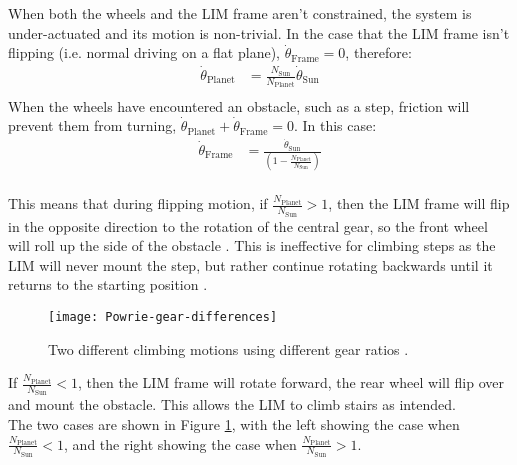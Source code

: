 When both the wheels and the LIM frame aren't constrained, the system is under-actuated and its motion is non-trivial. In the case that the LIM frame isn't flipping (i.e. normal driving on a flat plane), $\dot{\theta}_{\mathrm{Frame}} = 0$, therefore:\\
 \begin{align*}
 	\dot{\theta}_{\mathrm{Planet}} &= \frac{N_\mathrm{Sun}}{N_\mathrm{Planet}}\dot{\theta}_{\mathrm{Sun}} \tag{2}\\
 \end{align*}
When the wheels have encountered an obstacle, such as a step, friction will prevent them from turning, $\dot{\theta}_{\mathrm{Planet}} + \dot{\theta}_{\mathrm{Frame}} = 0$. In this case:
\begin{align*}
	\dot{\theta}_{\mathrm{Frame}} &= \frac{\dot{\theta}_{\mathrm{Sun}}}{(1-\frac{N_\mathrm{Planet}}{N_\mathrm{Sun}})} \tag{3}\\
\end{align*}

This means that during flipping motion, if $\frac{N_\mathrm{Planet}}{N_\mathrm{Sun}} > 1$, then the LIM frame will flip in the opposite direction to the rotation of the central gear, so the front wheel will roll up the side of the obstacle \citep{Wilson-2013}. This is ineffective for climbing steps as the LIM will never mount the step, but rather continue rotating backwards until it returns to the starting position \citep{Haskel-2017}.\\

\begin{figure}[h]
	\centering
	\texttt{[image: Powrie-gear-differences]}
	\caption{Two different climbing motions using different gear ratios \citep{Powrie-2019}.}
	\label{Powrie gears}
\end{figure}

If $\frac{N_\mathrm{Planet}}{N_\mathrm{Sun}} < 1$, then the LIM frame will rotate forward, the rear wheel will flip over and mount the obstacle. This allows the LIM to climb stairs as intended.\\
The two cases are shown in Figure \ref{Powrie gears}, with the left showing the case when $\frac{N_\mathrm{Planet}}{N_\mathrm{Sun}} < 1$, and the right showing the case when $\frac{N_\mathrm{Planet}}{N_\mathrm{Sun}} > 1$.



